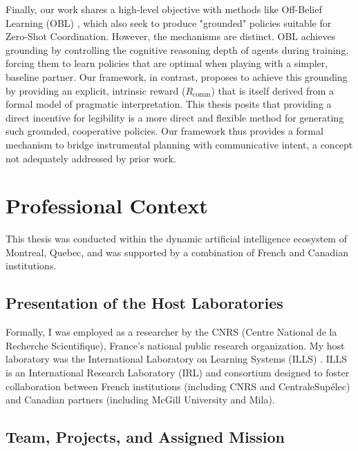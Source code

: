 \documentclass[12pt, a4paper]{report}
\newcommand{\Rcomm}{R_{\text{comm}}}
\begin{document}
Finally, our work shares a high-level objective with methods like Off-Belief Learning (OBL) \cite{Hu_Lerer_Cui_Wu_Pineda_Brown_Foerster_2021}, which also seek to produce "grounded" policies suitable for Zero-Shot Coordination. However, the mechanisms are distinct. OBL achieves grounding by controlling the cognitive reasoning depth of agents during training, forcing them to learn policies that are optimal when playing with a simpler, baseline partner. Our framework, in contrast, proposes to achieve this grounding by providing an explicit, intrinsic reward ($\Rcomm$) that is itself derived from a formal model of pragmatic interpretation. This thesis posits that providing a direct incentive for legibility is a more direct and flexible method for generating such grounded, cooperative policies. Our framework thus provides a formal mechanism to bridge instrumental planning with communicative intent, a concept not adequately addressed by prior work.


\chapter{Professional Context}

This thesis was conducted within the dynamic artificial intelligence ecosystem of Montreal, Quebec, and was supported by a combination of French and Canadian institutions.

\section{Presentation of the Host Laboratories}

Formally, I was employed as a researcher by the CNRS (Centre National de la Recherche Scientifique), France's national public research organization. My host laboratory was the International Laboratory on Learning Systems (ILLS) \cite{CNRS_Ottawa_2025}. ILLS is an International Research Laboratory (IRL) and consortium designed to foster collaboration between French institutions (including CNRS and CentraleSupélec) and Canadian partners (including McGill University and Mila).

\section{Team, Projects, and Assigned Mission}
\end{document}
